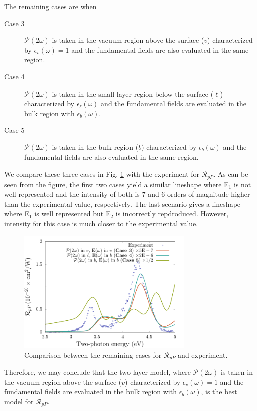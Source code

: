 \documentclass{article}
\begin{document}
\begin{enumerate}
The remaining cases are when
\begin{description}
\item[Case 3] $\mathcal{P}(2\omega)$ is taken in the vacuum region above the
surface ($v$) characterized by $\epsilon_{v}(\omega) = 1$ and the fundamental
fields are also evaluated in the same region.
\item[Case 4] $\mathcal{P}(2\omega)$ is taken in the small layer region below
the surface ($\ell$) characterized by $\epsilon_{\ell}(\omega)$ and the
fundamental fields are evaluated in the bulk region with $\epsilon_{b}(\omega)$.
\item[Case 5] $\mathcal{P}(2\omega)$ is taken in the bulk region ($b$)
characterized by $\epsilon_{b}(\omega)$ and the fundamental fields are also
evaluated in the same region.
\end{description}
We compare these three cases in Fig. \ref{comparison} with the experiment for
$\mathcal{R}_{pP}$. As can be seen from the figure, the first two cases
yield a similar lineshape where E$_{1}$ is not well represented and the
intensity of both is 7 and 6 orders of magnitude higher than the experimental
value, respectively. The last scenario gives a lineshape where E$_{1}$ is well
represented but E$_{2}$ is incorrectly repdroduced. However, intensity for this
case is much closer to the experimental value.

\begin{figure}[t]
\centering
\includegraphics[width=0.75\textwidth]{figures/rpp-comparison}
\caption{Comparison between the remaining cases for $\mathcal{R}_{pP}$ and
experiment.}
\label{comparison}
\end{figure}
\end{enumerate}

Therefore, we may conclude that the two layer model, where
$\mathcal{P}(2\omega)$ is taken in the vacuum region above the surface ($v$)
characterized by $\epsilon_{v}(\omega) = 1$ and the fundamental fields are
evaluated in the bulk region with $\epsilon_{b}(\omega)$, is the best model for
$\mathcal{R}_{pP}$.
\end{document}
